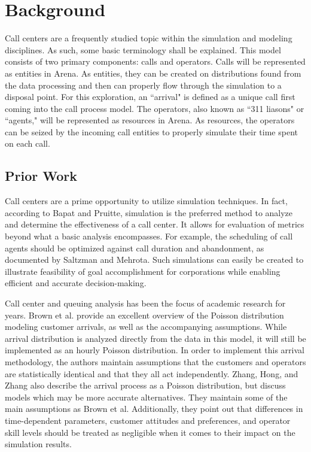 \documentclass[12pt,twocolumn]{article}
\begin{document}
\section{Background}
Call centers are a frequently studied topic within the simulation and modeling disciplines.  As such, some basic terminology shall be explained.  This model consists of two primary components:  calls and operators.  Calls will be represented as entities in Arena.  As entities, they can be created on distributions found from the data processing and then can properly flow through the simulation to a disposal point.  For this exploration, an ``arrival" is defined as a unique call first coming into the call process model.  The operators, also known as ``311 liasons" or ``agents," will be represented as resources in Arena.  As resources, the operators can be seized by the incoming call entities to properly simulate their time spent on each call.

	\subsection{Prior Work}

Call centers are a prime opportunity to utilize simulation techniques.  In fact, according to Bapat and Pruitte, simulation is the preferred method to analyze and determine the effectiveness of a call center.\cite{bapat}  It allows for evaluation of metrics beyond what a basic analysis encompasses.  For example, the scheduling of call agents should be optimized against call duration and abandonment, as documented by Saltzman and Mehrota\cite{saltzman}\cite{baraka}.  Such simulations can easily be created to illustrate feasibility of goal accomplishment for corporations while enabling efficient and accurate decision-making\cite{saltzman2}.

\par


Call center and queuing analysis has been the focus of academic research for years.  Brown et al. provide an excellent overview of the Poisson distribution modeling customer arrivals, as well as the accompanying assumptions\cite{brown}.  While arrival distribution is analyzed directly from the data in this model, it will still be implemented as an hourly Poisson distribution. In order to implement this arrival methodology, the authors maintain assumptions that the customers and operators are statistically identical and that they all act independently.  Zhang, Hong, and Zhang also describe the arrival process as a Poisson distribution, but discuss models which may be more accurate alternatives\cite{zhang}.  They maintain some of the main assumptions as Brown et al.  Additionally, they point out that differences in time-dependent parameters, customer attitudes and preferences, and operator skill levels should be treated as negligible when it comes to their impact on the simulation results.
\end{document}

